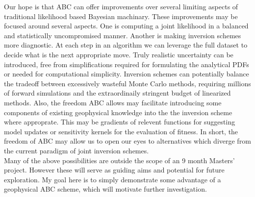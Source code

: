 Our hope is that ABC can offer improvements over several limiting aspects of traditional likelihood based Bayesian machinary. These improvements may be focused around several aspects. One is computing a joint likelihood in a balanced and statistically uncompromised manner. Another is making inversion schemes more diagnostic. At each step in an algorithm we can leverage the full dataset to decide what is the next appropriate move. Truly realistic uncertainty can be introduced, free from simplifications required for formulating the analytical PDFs or needed for computational simplicity. Inversion schemes can potentially balance the tradeoff between excessively wasteful Monte Carlo methods, requiring millions of forward simulations and the extraordinaily stringent budget of linearized methods. Also, the freedom ABC allows may facilitate introducing some components of existing geophysical knowledge into the the inversion scheme where approprate. This may be gradients of relevent functions for suggesting model updates or sensitivity kernels for the evaluation of fitness. In short, the freedom of ABC may allow us to open our eyes to alternatives which diverge from the current paradigm of joint inversion schemes. \\

Many of the above possibilities are outside the scope of an 9 month Masters' project. However these will serve as guiding aims and potential for future exploration. My goal here is to simply demonstrate some advantage of a geophysical ABC scheme, which will motivate further investigation.